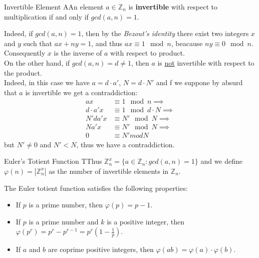 \bigskip

\noindent


\begin{defBox}{Invertible Element}
AAn element $a \in \mathbb{Z}_n$ is \textbf{invertible} with respect to multiplication if and only if $gcd(a, n) = 1$.
\end{defBox}

\noindent
Indeed, if $gcd(a, n) = 1$, then by the \textit{Bezout's identity} there exist two integers $x$ and $y$ such that $ax + ny = 1$, and thus $ax \equiv 1 \mod n$, beacause $ny \equiv 0 \mod n$.\\
Consequently $x$ is the inverse of $a$ with respect to product.\\
On the other hand, if $gcd(a, n) = d \neq 1$, then $a$ is \underline{not} invertible with respect to the product.\\
Indeed, in this case we have $a= d \cdot a'$, $N = d \cdot N'$ and f we suppone by absurd that $a$ is invertible we get a contraddiction: 
\begin{align*}
    ax &\equiv 1 \mod n \implies \\
    d \cdot a' x &\equiv 1 \mod d \cdot N \implies \\
    N'da'x &\equiv N' \mod N  \implies \\
    Na'x &\equiv N' \mod N \implies \\
    0 &\equiv N' mod N
\end{align*}
\indent
but $N' \neq 0$ and $N' < N$, thus we have a contraddiction.\\

\begin{defBox}{Euler's Totient Function}
    TThus $\mathbb{Z}^x_n = \{ a\in \mathbb{Z}_n : gcd(a,n) = 1 \}$  and we define $\varphi(n) = |\mathbb{Z}^x_n|$ as the number of invertible elements in $\mathbb{Z}_n$.
    \medskip

    \noindent
    The Euler totient function satisfies the following properties:
    \begin{itemize}
        \item If $p$ is a prime number, then $\varphi(p) = p-1$.
        \item If $p$ is a prime number and $k$ is a positive integer, then $\varphi(p^r) = p^r - p^{r-1} = p^r (1 - \frac{1}{p})$.
        \item If $a$ and $b$ are coprime positive integers, then $\varphi(ab) = \varphi(a) \cdot \varphi(b)$.
    \end{itemize}
\end{defBox}


